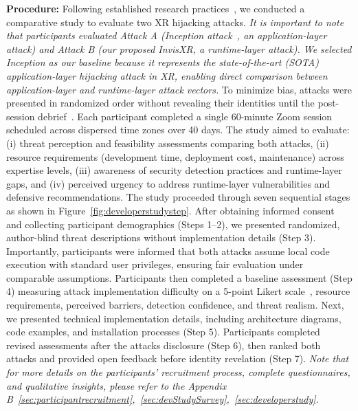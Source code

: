 \documentclass[letterpaper,twocolumn,10pt]{article}
\begin{document}
\textbf{Procedure:} Following established research practices~\cite{muller2014survey,creswell2017designing,fetters2013achieving}, we conducted a comparative study to evaluate two XR hijacking attacks. \textit{It is important to note that participants evaluated Attack A (Inception attack~\cite{yang2024inception}, an application-layer attack) and Attack B (our proposed InvisXR, a runtime-layer attack). We selected Inception as our baseline because it represents the state-of-the-art (SOTA) application-layer hijacking attack in XR, enabling direct comparison between application-layer and runtime-layer attack vectors.} To minimize bias, attacks were presented in randomized order without revealing their identities until the post-session debrief~\cite{cheng2023exploring}. Each participant completed a single 60-minute Zoom session scheduled across dispersed time zones over 40 days. The study aimed to evaluate: (i) threat perception and feasibility assessments comparing both attacks, (ii) resource requirements (development time, deployment cost, maintenance) across expertise levels, (iii) awareness of security detection practices and runtime-layer gaps, and (iv) perceived urgency to address runtime-layer vulnerabilities and defensive recommendations. The study proceeded through seven sequential stages as shown in Figure~\ref{fig:developerstudystep}. After obtaining informed consent and collecting participant demographics (Steps 1–2), we presented randomized, author-blind threat descriptions without implementation details (Step 3). Importantly, participants were informed that both attacks assume local code execution with standard user privileges, ensuring fair evaluation under comparable assumptions. Participants then completed a baseline assessment (Step 4) measuring attack implementation difficulty on a 5-point Likert scale~\cite{nemoto2014likert}, resource requirements, perceived barriers, detection confidence, and threat realism. Next, we presented technical implementation details, including architecture diagrams, code examples, and installation processes (Step 5). Participants completed revised assessments after the attacks disclosure (Step 6), then ranked both attacks and provided open feedback before identity revelation (Step 7). \textit{Note that for more details on the participants’ recruitment process, complete questionnaires, and qualitative insights, please refer to the Appendix B~\ref{sec:participantrecruitment},~\ref{sec:devStudySurvey},~\ref{sec:developerstudy}.}
\end{document}

